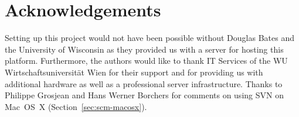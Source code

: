 \documentclass[a4paper]{article}
\let\code=\texttt
\let\email=\texttt
\newcommand{\pkg}[1]{{\normalfont\fontseries{b}\selectfont #1}}
\begin{document}


\section{Acknowledgements}

Setting up this project would not have been possible without Douglas
Bates and the University of Wisconsin as they provided us with a
server for hosting this platform. Furthermore, the authors would like
to thank IT Services of the WU Wirtschaftsuniversit\"at Wien for their
support and for providing us with additional hardware as well as a
professional server infrastructure.  Thanks to Philippe Grosjean and
Hans Werner Borchers for comments on using SVN on Mac~OS~X
(Section~\ref{sec:scm-macosx}).




\end{document}
